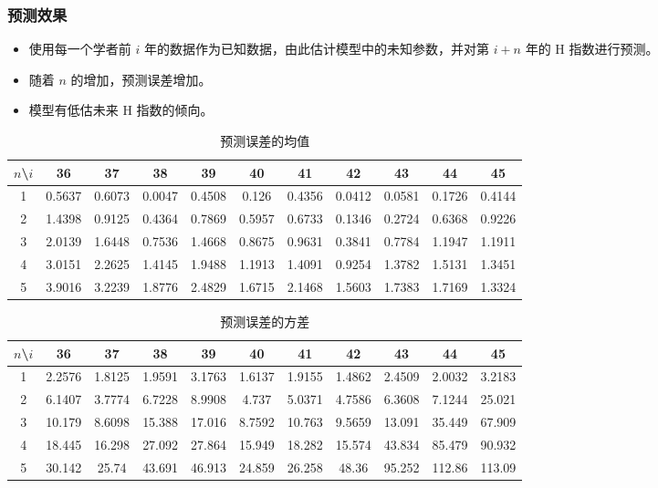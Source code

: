 \documentclass[11pt,compress,t, xcolor=table]{beamer}
\begin{document}
\begin{frame}
	\frametitle{预测效果}
	\begin{itemize}	
		\footnotesize
		\item 使用每一个学者前 $i$ 年的数据作为已知数据，由此估计模型中的未知参数，并对第 $i+n$ 年的 H 指数进行预测。
		\item 随着 $n$ 的增加，预测误差增加。
		\item 模型有低估未来 H 指数的倾向。
	\end{itemize}

		\begin{table}[H]
			\tiny
			\centering
			\caption{预测误差的均值}
			\begin{tabular}{c|cccccccccc}
				$n$\textbackslash{}$i$ & 36     & 37     & 38     & 39     & 40     & 41     & 42     & 43     & 44     & 45     \\ \hline
				1                  & 0.5637 & 0.6073 & 0.0047 & 0.4508 & 0.126  & 0.4356 & 0.0412 & 0.0581 & 0.1726 & 0.4144 \\
				2                  & 1.4398 & 0.9125 & 0.4364 & 0.7869 & 0.5957 & 0.6733 & 0.1346 & 0.2724 & 0.6368 & 0.9226 \\
				3                  & 2.0139 & 1.6448 & 0.7536 & 1.4668 & 0.8675 & 0.9631 & 0.3841 & 0.7784 & 1.1947 & 1.1911 \\
				4                  & 3.0151 & 2.2625 & 1.4145 & 1.9488 & 1.1913 & 1.4091 & 0.9254 & 1.3782 & 1.5131 & 1.3451 \\
				5                  & 3.9016 & 3.2239 & 1.8776 & 2.4829 & 1.6715 & 2.1468 & 1.5603 & 1.7383 & 1.7169 & 1.3324
			\end{tabular}
		\end{table}
		
		\begin{table}[H]
			\tiny
			\centering
			\caption{预测误差的方差}
			\begin{tabular}{c|cccccccccc}
				$n$\textbackslash{}$i$ & 36     & 37     & 38     & 39     & 40     & 41     & 42     & 43     & 44     & 45     \\ \hline
				1                  & 2.2576 & 1.8125 & 1.9591 & 3.1763 & 1.6137 & 1.9155 & 1.4862 & 2.4509 & 2.0032 & 3.2183 \\
				2                  & 6.1407 & 3.7774 & 6.7228 & 8.9908 & 4.737  & 5.0371 & 4.7586 & 6.3608 & 7.1244 & 25.021 \\
				3                  & 10.179 & 8.6098 & 15.388 & 17.016 & 8.7592 & 10.763 & 9.5659 & 13.091 & 35.449 & 67.909 \\
				4                  & 18.445 & 16.298 & 27.092 & 27.864 & 15.949 & 18.282 & 15.574 & 43.834 & 85.479 & 90.932 \\
				5                  & 30.142 & 25.74  & 43.691 & 46.913 & 24.859 & 26.258 & 48.36  & 95.252 & 112.86 & 113.09
			\end{tabular}
		\end{table}


			
\end{frame}
\end{document}
